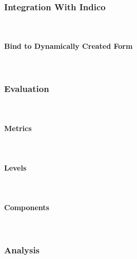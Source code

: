 \subsubsection{Integration With Indico}\mbox{}\\

\paragraph{Bind to Dynamically Created Form}\mbox{}\\

\subsubsection{Evaluation}\mbox{}\\

\paragraph{Metrics}\mbox{}\\
\paragraph{Levels}\mbox{}\\
\paragraph{Components}\mbox{}\\

\subsubsection{Analysis}\mbox{}\\
